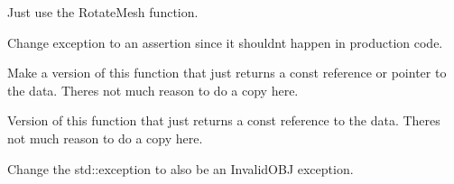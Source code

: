 \begin{DoxyRefList}
Just use the Rotate\+Mesh function. 



Change exception to an assertion since it shouldn\textquotesingle{}t happen in production code.  
\item[Member \mbox{\hyperlink{a01285_af2d1b696c55aa036cff585d2e7eba50b}{HF\+::Geometry\+::Mesh\+Info\texorpdfstring{$<$}{<} numeric\+\_\+type \texorpdfstring{$>$}{>}\+::Get\+Indexed\+Vertices}} () const]\label{a00386__todo000012}%
%
 Make a version of this function that just returns a const reference or pointer to the data. There\textquotesingle{}s not much reason to do a copy here.  
\item[Member \mbox{\hyperlink{a01285_afddea10734ba213b2bb5cc148c24c942}{HF\+::Geometry\+::Mesh\+Info\texorpdfstring{$<$}{<} numeric\+\_\+type \texorpdfstring{$>$}{>}\+::get\+Raw\+Indices}} () const]\label{a00386__todo000013}%
%
 Version of this function that just returns a const reference to the data. There\textquotesingle{}s not much reason to do a copy here. 
\item[Member \mbox{\hyperlink{a01285_a1487a083b0dc49eea88d7a0f04b270d0}{HF\+::Geometry\+::Mesh\+Info\texorpdfstring{$<$}{<} numeric\+\_\+type \texorpdfstring{$>$}{>}\+::Mesh\+Info}} (const std\+::vector\texorpdfstring{$<$}{<} std\+::array$<$ numeric\+\_\+type, 3 $>$ \texorpdfstring{$>$}{>} \&vertices, int id, std\+::string name=\char`\"{}\char`\"{})]\label{a00386__todo000008}%
%
Change the std\+::exception to also be an Invalid\+OBJ exception. 




\end{DoxyRefList}
